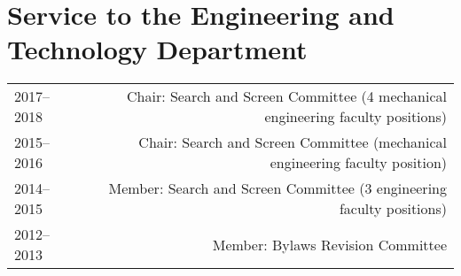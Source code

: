 \section*{Service to the Engineering and Technology Department}
\begin{tabular}{L!{\VRule}R}
2017--2018&Chair: Search and Screen Committee (4 mechanical engineering faculty positions)\\
2015--2016&Chair: Search and Screen Committee (mechanical engineering faculty position)\\
2014--2015&Member: Search and Screen Committee (3 engineering faculty positions)\\
2012--2013&Member: Bylaws Revision Committee\\
\end{tabular}